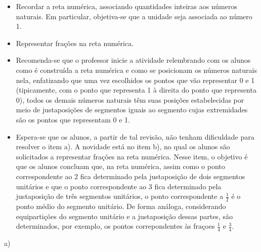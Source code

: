 \begin{multicols}{2}
\begin{objetivos}[label=chap3-ativ2]{}{}
\begin{itemize} %
    \item Recordar a reta numérica, associando quantidades inteiras aos números naturais. Em particular, objetiva-se que a unidade seja associada ao número 1.
    \item Representar frações na reta numérica.
\end{itemize} %
\end{objetivos}

\begin{orientacoes}{}{}

\begin{itemize} %
    \item        Recomenda-se que o professor inicie a atividade relembrando com os alunos como é construída a reta numérica e como se posicionam os números naturais nela, enfatizando que uma vez escolhidos os pontos que vão representar 0 e 1 (tipicamente, com o ponto que representa 1 à direita do ponto que representa 0), todos os demais números naturais têm suas posições estabelecidas por meio de justaposições de segmentos iguais ao segmento cujas extremidades são os pontos que representam 0 e 1.
    \item       Espera-se que os alunos, a partir de tal revisão, não tenham dificuldade para resolver o item a). A novidade está no item b), no qual os alunos são solicitados a representar frações na reta numérica. Nesse item, o objetivo é que os alunos concluam que, na reta numérica, assim como o ponto correspondente ao 2 fica determinado pela justaposição de dois segmentos unitários e que o ponto correspondente ao 3 fica determinado pela justaposição de três segmentos unitários, o ponto correspondente a $\frac{1}{2}$ é o ponto médio do segmento unitário. De forma análoga, considerando equipartições do segmento unitário e a justaposição dessas partes, são determinados, por exemplo, os pontos correpondentes às fraçoes $\frac{1}{4}$ e $\frac{3}{4}$.
\end{itemize} %
\end{orientacoes}

\begin{solucao}{}{}
\noindent a)

    \noindent{}


\end{solucao}
\end{multicols}
